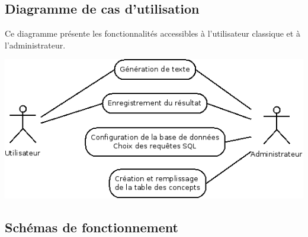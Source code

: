 \documentclass[12pt]{report}
\begin{document}
\subsection{Diagramme de cas d'utilisation}

	Ce diagramme présente les fonctionnalités accessibles à l'utilisateur classique et à l'administrateur.

	\includegraphics[scale=0.5]{Diagramme1.png}

\subsection{Schémas de fonctionnement}
\end{document}
